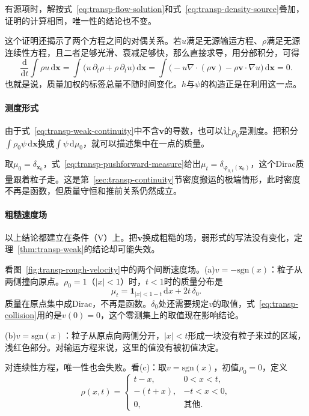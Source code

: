 有源项时，解按式~\eqref{eq:transp-flow-solution}和式~\eqref{eq:transp-density-source}叠加，证明的计算相同，唯一性的结论也不变。

这个证明还揭示了两个方程之间的对偶关系。若$u$满足无源输运方程、$\rho$满足无源连续性方程，且二者足够光滑、衰减足够快，那么直接求导，用分部积分，可得
\[
  \frac{\mathrm{d}}{\mathrm{d}t}\int\rho u\,\mathrm{d}\bm{x}
  =\int\bigl(u\,\partial_t\rho+\rho\,\partial_tu\bigr)\,\mathrm{d}\bm{x}
  =\int\bigl(-u\nabla\cdot(\rho\bm{v})-\rho\bm{v}\cdot\nabla u\bigr)\,\mathrm{d}\bm{x}=0.
\]
也就是说，质量加权的标签总量不随时间变化。$h$与$\psi$的构造正是在利用这一点。

\paragraph{测度形式}
由于式~\eqref{eq:transp-weak-continuity}中不含$\bm{v}$的导数，也可以让$\rho_0$是测度。把积分$\int\rho_0\psi\,\mathrm{d}\bm{x}$换成$\int\psi\,\mathrm{d}\mu_0$，就可以描述集中在一点的质量。

取$\mu_0=\delta_{\bm{x}_0}$，式~\eqref{eq:transp-pushforward-measure}给出$\mu_t=\delta_{\bm{\varphi}_{0,t}(\bm{x}_0)}$，这个Dirac质量跟着粒子走。这是第~\ref{sec:transp-continuity}节密度搬运的极端情形，此时密度不再是函数，但质量守恒和推前关系仍然成立。

\paragraph{粗糙速度场}
以上结论都建立在条件（V）上。把$\bm{v}$换成粗糙的场，弱形式的写法没有变化，定理~\ref{thm:transp-weak}的结论却可能失效。

看图~\ref{fig:transp-rough-velocity}中的两个间断速度场。(a)$v=-\mathrm{sgn}(x)$：粒子从两侧撞向原点。$\rho_0=1$（$\lvert x\rvert<1$）时，$t<1$时的质量分布是
\begin{equation}
  \mu_t=\mathbf{1}_{\lvert x\rvert<1-t}\,\mathrm{d}x+2t\,\delta_0.
  \label{eq:transp-collision}
\end{equation}
质量在原点集中成Dirac，不再是函数。$\delta_0$处还需要规定$v$的取值，式~\eqref{eq:transp-collision}用的是$v(0)=0$，这个零测集上的取值现在影响结论。

(b)$v=\mathrm{sgn}(x)$：粒子从原点向两侧分开，$\lvert x\rvert<t$形成一块没有粒子来过的区域，浅红色部分。对输运方程来说，这里的值没有被初值决定。

对连续性方程，唯一性也会失败。看(c)：取$v=\mathrm{sgn}(x)$，初值$\rho_0=0$，定义
\begin{equation}
  \rho(x,t)=
  \begin{cases}
    t-x, & 0<x<t,\\
    -(t+x), & -t<x<0,\\
    0, & \text{其他}.
  \end{cases}
  \label{eq:transp-nonunique-density}
\end{equation}

